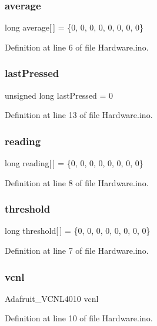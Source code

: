 \subsubsection{\texorpdfstring{average}{average}}
{\footnotesize\ttfamily long average\mbox{[}$\,$\mbox{]} = \{0, 0, 0, 0, 0, 0, 0, 0\}}



Definition at line 6 of file Hardware.\+ino.

\mbox{\label{_hardware_8ino_ac725663f0bb1d8d2b904d4440bcc38d1}} 
\subsubsection{\texorpdfstring{lastPressed}{lastPressed}}
{\footnotesize\ttfamily unsigned long last\+Pressed = 0}



Definition at line 13 of file Hardware.\+ino.

\mbox{\label{_hardware_8ino_ab219875e305edef08cd33f81d004c80a}} 
\subsubsection{\texorpdfstring{reading}{reading}}
{\footnotesize\ttfamily long reading\mbox{[}$\,$\mbox{]} = \{0, 0, 0, 0, 0, 0, 0, 0\}}



Definition at line 8 of file Hardware.\+ino.

\mbox{\label{_hardware_8ino_ac32fe680767b975eb3dcffe87f347a85}} 
\subsubsection{\texorpdfstring{threshold}{threshold}}
{\footnotesize\ttfamily long threshold\mbox{[}$\,$\mbox{]} = \{0, 0, 0, 0, 0, 0, 0, 0\}}



Definition at line 7 of file Hardware.\+ino.

\mbox{\label{_hardware_8ino_af8997547c94d8bb6ee460b3538e4cd11}} 
\subsubsection{\texorpdfstring{vcnl}{vcnl}}
{\footnotesize\ttfamily Adafruit\+\_\+\+V\+C\+N\+L4010 vcnl}



Definition at line 10 of file Hardware.\+ino.

